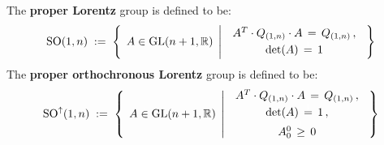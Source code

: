 \vskip 0.5cm
\begin{definition}
\mbox{}
\vskip 0.1cm
\noindent
The \textbf{proper Lorentz} group is defined to be:
\begin{equation*}
\SO(1,n)
\; := \;
	\left\{\;\,
		A \overset{{\color{white}.}}{\in} \GL(n+1,\Re)
		\;\left\vert\;\,
			\begin{array}{ccc}
			A^{T} \cdot Q_{(1,n)} \cdot A \,=\, Q_{(1,n)}\,,
			\\
			\textnormal{det}(A) \,\overset{{\color{white}1}}{=}\, 1
			\end{array}
			\right.
		\;\right\}
\end{equation*}
The \textbf{proper orthochronous Lorentz} group is defined to be:
\begin{equation*}
\SO^{\uparrow}(1,n)
\; := \;
	\left\{\;\,
		A \overset{{\color{white}.}}{\in} \GL(n+1,\Re)
		\;\left\vert\;\,
			\begin{array}{ccc}
			A^{T} \cdot Q_{(1,n)} \cdot A \,=\, Q_{(1,n)}\,,
			\\
			\textnormal{det}(A) \,\overset{{\color{white}1}}{=}\, 1\,,
			\\
			A^{0}_{0} \,\overset{{\color{white}1}}{\geq}\, 0
			\end{array}
			\right.
		\;\right\}
\end{equation*}
\end{definition}

